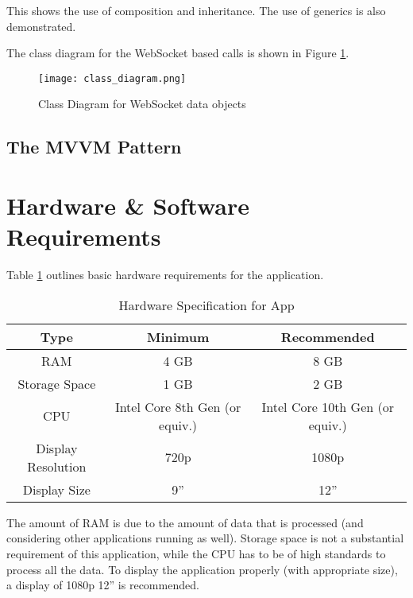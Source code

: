This shows the use of composition and inheritance. The use of generics is also demonstrated.

The class diagram for the WebSocket based calls is shown in Figure \ref{fig:classes-ws}.

\begin{figure}[htp]
    \centering
    \texttt{[image: class\_diagram.png]}
    \caption{Class Diagram for WebSocket data objects}
    \label{fig:classes-ws}
\end{figure}

\subsection{The MVVM Pattern}

\section{Hardware \& Software Requirements}

Table \ref{tab:hardware-spec} outlines basic hardware requirements for the application.

\begin{table}[htp]
    \centering

    \begin{tabular}{|c|c|c|}
        \hline
        Type               & Minimum                        & Recommended                     \\
        \hline
        RAM                & 4 GB                           & 8 GB                            \\
        Storage Space      & 1 GB                           & 2 GB                            \\
        CPU                & Intel Core 8th Gen (or equiv.) & Intel Core 10th Gen (or equiv.) \\
        Display Resolution & 720p                           & 1080p                           \\
        Display Size       & 9''                            & 12''                            \\
        \hline
    \end{tabular}
    \caption{Hardware Specification for App}
    \label{tab:hardware-spec}
\end{table}

The amount of RAM is due to the amount of data that is processed (and considering other applications running as well). Storage space is not a substantial requirement of this application, while the CPU has to be of high standards to process all the data. To display the application properly (with appropriate size), a display of 1080p 12'' is recommended.

